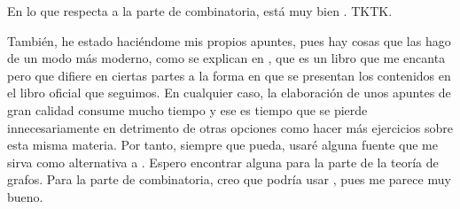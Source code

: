 En lo que respecta a la parte de combinatoria, está muy bien
\cite{chuan-chong}. TKTK.






También, he estado haciéndome mis propios apuntes, pues hay cosas que las
hago de un modo más moderno, como se explican en
\cite{weissman}, que es un libro que me encanta pero que difiere
en ciertas partes a la forma en que se presentan los contenidos en el libro
oficial que seguimos. En cualquier caso, la elaboración de unos apuntes de
gran calidad consume mucho tiempo y ese es tiempo que se pierde
innecesariamente en detrimento de otras opciones como hacer más ejercicios
sobre esta misma materia. Por tanto, siempre que pueda, usaré alguna fuente
que me sirva como alternativa a \cite{texto-uned}. Espero encontrar
alguna para la parte de la teoría de grafos. Para la parte de combinatoria,
creo que podría usar \cite{chuan-chong}, pues me parece muy bueno.



